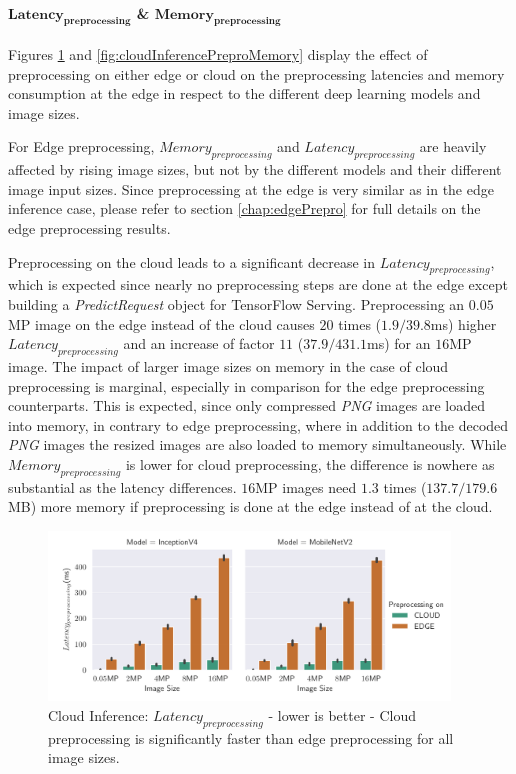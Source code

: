 \paragraph{$\mathbf{Latency_{preprocessing}}$ \& $\mathbf{Memory_{preprocessing}}$}
Figures \ref{fig:cloudInferencePreproLat} and \ref{fig:cloudInferencePreproMemory} display the effect of preprocessing on either edge or cloud on the preprocessing latencies and memory consumption at the edge in respect to the different deep learning models and image sizes.

For Edge preprocessing, $Memory_{preprocessing}$ and $Latency_{preprocessing}$ are heavily affected by rising image sizes, but not by the different models and their different image input sizes.
Since preprocessing at the edge is very similar as in the edge inference case, please refer to section \ref{chap:edgePrepro} for full details on the edge preprocessing results.

Preprocessing on the cloud leads to a significant decrease in $Latency_{preprocessing}$, which is expected since nearly no preprocessing steps are done at the edge except building a \emph{PredictRequest} object for TensorFlow Serving.
Preprocessing an $0.05$MP image on the edge instead of the cloud causes $20$ times ($1.9/39.8$ms) higher $Latency_{preprocessing}$ and an increase of factor $11$ ($37.9/431.1$ms) for an $16$MP image.
The impact of larger image sizes on memory in the case of cloud preprocessing is marginal, especially in comparison for the edge preprocessing counterparts. This is expected, since only compressed \emph{PNG} images are loaded into memory, in contrary to edge preprocessing, where in addition to the decoded \emph{PNG} images the resized images are also loaded to memory simultaneously.
While $Memory_{preprocessing}$ is lower for cloud preprocessing, the difference is nowhere as substantial as the latency differences. $16$MP images need $1.3$ times ($137.7/179.6$MB) more memory if preprocessing is done at  the edge instead of at the cloud.

\begin{figure}[!htb]
\centering
\includegraphics[width=0.95\textwidth]{./Bilder/single_plots/cloud_inference_plots/Cloud_Inference_Preprocessing_Latency.pdf}
\caption[Cloud Inference:  $Latency_{preprocessing}$ - lower is better]{Cloud Inference:  $Latency_{preprocessing}$ - lower is better - Cloud preprocessing is significantly faster than edge preprocessing for all image sizes.}
\label{fig:cloudInferencePreproLat}
\end{figure}

